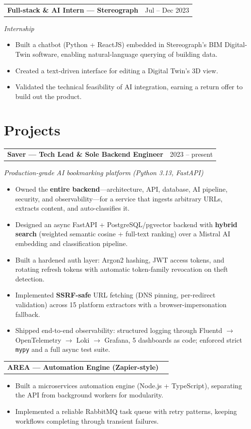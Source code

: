 \documentclass[10pt,a4paper]{article}
\makeatletter
\newcommand{\entry}[2]{%
  \vspace{1pt}\noindent\begin{tabular*}{\textwidth}{@{}l@{\extracolsep{\fill}}r@{}}
  \textbf{#1} & #2 \\
  \end{tabular*}\par}
\newcommand{\subentry}[1]{\noindent\textit{#1}\par\vspace{1pt}}
\makeatother
\begin{document}
\entry{Full-stack \& AI Intern --- Stereograph}{Jul -- Dec 2023}
\subentry{Internship}
\begin{itemize}
  \item Built a chatbot (Python + ReactJS) embedded in Stereograph's BIM Digital-Twin software, enabling natural-language querying of building data.
  \item Created a text-driven interface for editing a Digital Twin's 3D view.
  \item Validated the technical feasibility of AI integration, earning a return offer to build out the product.
\end{itemize}

\section{Projects}

\entry{Saver --- Tech Lead \& Sole Backend Engineer}{2023 -- present}
\subentry{Production-grade AI bookmarking platform (Python 3.13, FastAPI)}
\begin{itemize}
  \item Owned the \textbf{entire backend}---architecture, API, database, AI pipeline, security, and observability---for a service that ingests arbitrary URLs, extracts content, and auto-classifies it.
  \item Designed an async FastAPI + PostgreSQL/pgvector backend with \textbf{hybrid search} (weighted semantic cosine + full-text ranking) over a Mistral AI embedding and classification pipeline.
  \item Built a hardened auth layer: Argon2 hashing, JWT access tokens, and rotating refresh tokens with automatic token-family revocation on theft detection.
  \item Implemented \textbf{SSRF-safe} URL fetching (DNS pinning, per-redirect validation) across 15 platform extractors with a browser-impersonation fallback.
  \item Shipped end-to-end observability: structured logging through Fluentd $\rightarrow$ OpenTelemetry $\rightarrow$ Loki $\rightarrow$ Grafana, 5 dashboards as code; enforced strict \texttt{mypy} and a full async test suite.
\end{itemize}

\entry{AREA --- Automation Engine (Zapier-style)}{}
\begin{itemize}
  \item Built a microservices automation engine (Node.js + TypeScript), separating the API from background workers for modularity.
  \item Implemented a reliable RabbitMQ task queue with retry patterns, keeping workflows completing through transient failures.
\end{itemize}
\end{document}
